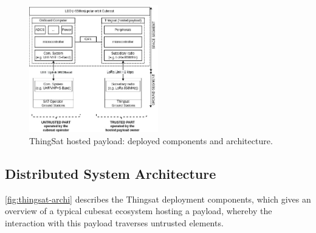 \begin{figure}[t]
    \includegraphics[width=0.5\textwidth]{Figures/globecom-thingsat-mods.jpg}
    \caption{ThingSat hosted payload: deployed components and architecture.}
    \label{fig:thingsat-archi}
\end{figure}



\subsection{Distributed System Architecture}

\autoref{fig:thingsat-archi} describes the Thingsat deployment components, which gives an
overview of a typical cubesat ecosystem hosting a payload, whereby the interaction with this payload traverses untrusted elements.

